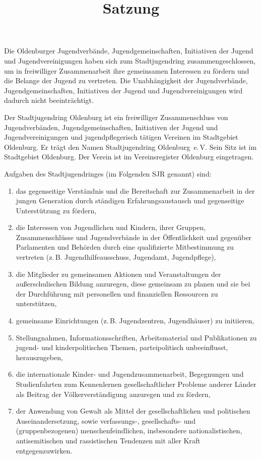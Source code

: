 \documentclass[10pt,a4paper,oneside,parskip=half]{scrartcl}
\title{Satzung}
\date{}
\author{}
\begin{document}
\maketitle

\begin{contract}

Die Oldenburger Jugendverbände, Jugendgemeinschaften, Initiativen der Jugend und Jugendvereinigungen haben sich zum Stadtjugendring zusammengeschlossen, um in freiwilliger Zusammenarbeit ihre gemeinsamen Interessen zu fördern und die Belange der Jugend zu vertreten. Die Unabhängigkeit der Jugendverbände, Jugendgemeinschaften, Initiativen der Jugend und Jugendvereinigungen wird dadurch nicht beeinträchtigt.

Der Stadtjugendring Oldenburg ist ein freiwilliger Zusammenschluss von Jugendverbänden, Jugendgemeinschaften, Initiativen der Jugend und Jugendvereinigungen und jugendpflegerisch tätigen Vereinen im Stadtgebiet Oldenburg.
Er trägt den Namen Stadtjugendring Oldenburg~e.\,V. Sein Sitz ist im Stadtgebiet Oldenburg. Der Verein ist im Vereinsregister Oldenburg eingetragen.

\label{aufgaben}
Aufgaben des Stadtjugendringes (im Folgenden SJR genannt) sind:
\begin{enumerate}
\item das gegenseitige Verständnis und die Bereitschaft zur Zusammenarbeit in der jungen Generation durch ständigen Erfahrungsaustausch und gegenseitige Unterstützung zu fördern,
\item die Interessen von Jugendlichen und Kindern, ihrer Gruppen, Zusammenschlüsse und Jugendverbände in der Öffentlichkeit und gegenüber Parlamenten und Behörden durch eine qualifizierte Mitbestimmung zu vertreten (z.\,B. Jugendhilfeausschuss, Jugendamt, Jugendpflege),
\item die Mitglieder zu gemeinsamen Aktionen und Veranstaltungen der außerschulischen Bildung anzuregen, diese gemeinsam zu planen und sie bei der Durchführung mit personellen und finanziellen Ressourcen zu unterstützen,
\item gemeinsame Einrichtungen (z.\,B. Jugendzentren, Jugendhäuser) zu initiieren,
\item Stellungnahmen, Informationsschriften, Arbeitsmaterial und Publikationen zu jugend- und kinderpolitischen Themen, parteipolitisch unbeeinflusst, herauszugeben,
\item die internationale Kinder- und Jugendzusammenarbeit, Begegnungen und Studienfahrten zum Kennenlernen gesellschaftlicher Probleme anderer Länder als Beitrag der Völkerverständigung anzuregen und zu fördern,
\item der Anwendung von Gewalt als Mittel der gesellschaftlichen und politischen Auseinandersetzung, sowie verfassungs-, gesellschafts- und (gruppenbezogenen) menschenfeindlichen, insbesondere nationalistischen, antisemitischen und rassistischen Tendenzen mit aller Kraft entgegenzuwirken.
\end{enumerate}


\end{contract}
\end{document}
